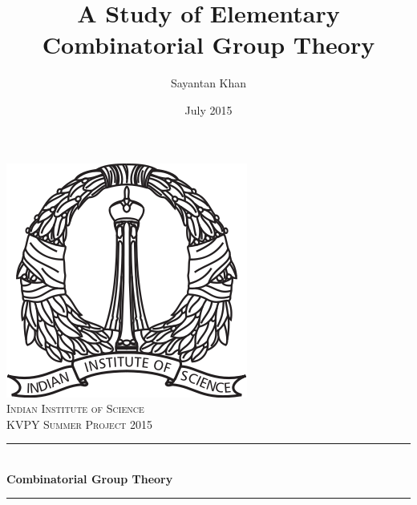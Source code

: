 \documentclass[12pt, titlepage]{article}
\title{A Study of Elementary Combinatorial Group Theory}
\author{Sayantan Khan}
\date{July 2015}
\theoremstyle{definition}
\begin{document}
\begin{titlepage}

\newcommand{\HRule}{\rule{\linewidth}{0.5mm}} %

\center %

\vspace*{1.5cm}


\includegraphics[scale=0.6]{images/logo.png}\\[1cm] %


\textsc{\LARGE Indian Institute of Science}\\[1.5cm] %
\textsc{\Large KVPY Summer Project 2015}\\[0.5cm] %


\HRule \\[0.4cm]
{ \huge \bfseries Combinatorial Group Theory}\\[0.4cm] %
\HRule \\[1.5cm]
 

\end{titlepage}
\end{document}
